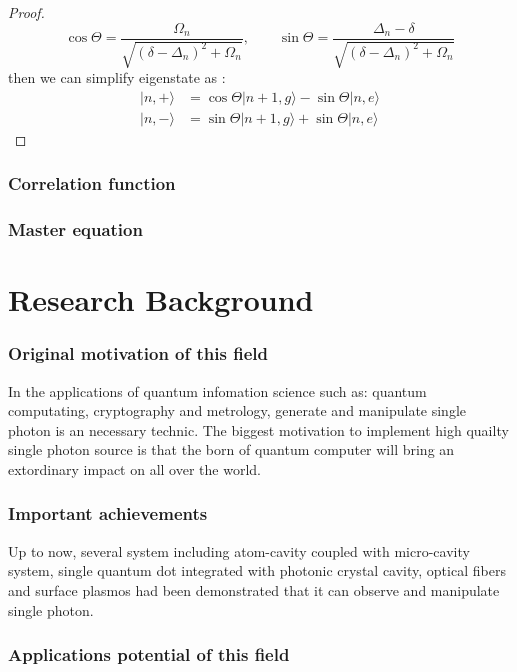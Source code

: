 \documentclass[10pt]{article}
\renewcommand{\ket}[1]{| #1 \rangle}
\begin{document}
\begin{proof}
\begin{equation}
                \cos\Theta = \frac{\Omega_n}{\sqrt{(\delta-\Delta_n)^2 + \Omega_n}}, \qquad \sin\Theta = \frac{\Delta_n - \delta}{\sqrt{(\delta-\Delta_n)^2 + \Omega_n}}
            \end{equation}
            then we can simplify eigenstate as :
            \begin{align}
                \ket{n,+} &= \cos\Theta \ket{n+1,g} - \sin\Theta \ket{n,e}\\
                \ket{n,-} &= \sin\Theta \ket{n+1,g} + \sin\Theta \ket{n,e}
            \end{align}
        \end{proof}

        \section{Correlation function}
        \section{Master equation}

    \part{Research Background}
        \section{Original motivation of this field}
            In the applications of quantum infomation science such as: quantum computating, cryptography and metrology, generate and manipulate
            single photon is an necessary technic. The biggest motivation to implement high quailty single photon source is that the born of quantum
            computer will bring an extordinary impact on all over the world.
        \section{Important achievements}
            Up to now, several system including atom-cavity coupled with micro-cavity system, single quantum dot integrated with photonic crystal cavity, 
            optical fibers and surface plasmos had been demonstrated that it can observe and manipulate single photon.
        \section{Applications potential of this field}
\end{document}
